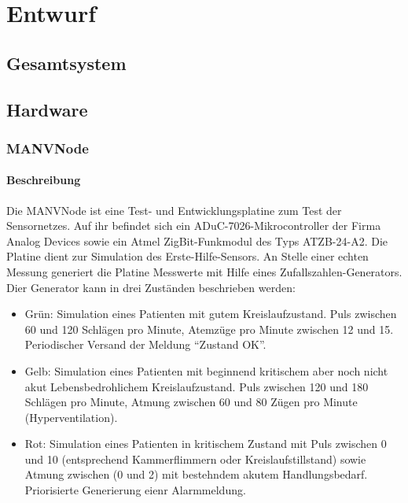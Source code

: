 

\chapter{Entwurf}

\section{Gesamtsystem}

\section{Hardware}
\subsection{MANVNode}
\subsubsection{Beschreibung}
Die MANVNode ist eine Test- und Entwicklungsplatine zum Test der Sensornetzes. Auf ihr befindet sich ein 
ADuC-7026-Mikrocontroller der Firma Analog Devices sowie ein Atmel ZigBit-Funkmodul des Typs ATZB-24-A2. Die Platine 
dient zur Simulation des Erste-Hilfe-Sensors. An Stelle einer echten Messung generiert die Platine Messwerte mit Hilfe 
eines Zufallszahlen-Generators.
Dier Generator kann in drei Zuständen beschrieben werden:

\begin{itemize}
    \item{Grün:} Simulation eines Patienten mit gutem Kreislaufzustand. Puls zwischen 60 und 120 Schlägen pro Minute, 
                 Atemzüge pro Minute zwischen 12 und 15. Periodischer Versand der Meldung "`Zustand OK"'.
    \item{Gelb:} Simulation eines Patienten mit beginnend kritischem aber noch nicht akut Lebensbedrohlichem 
                 Kreislaufzustand. Puls zwischen 120 und 180 Schlägen pro Minute, Atmung zwischen 60 und 80
                 Zügen pro Minute (Hyperventilation).
    \item{Rot:}  Simulation eines Patienten in kritischem Zustand mit Puls zwischen 0 und 10 (entsprechend
                 Kammerflimmern oder Kreislaufstillstand) sowie Atmung zwischen (0 und 2) mit bestehndem
                 akutem Handlungsbedarf. Priorisierte Generierung eienr Alarmmeldung.
\end{itemize}

